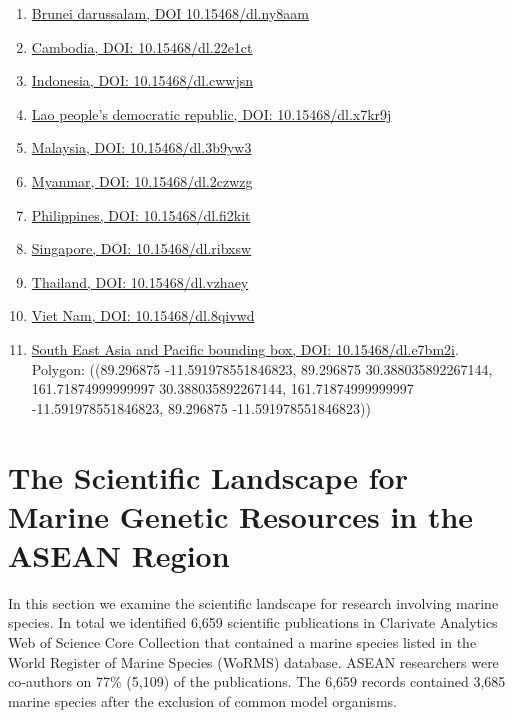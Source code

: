 \documentclass[]{book}
\providecommand{\tightlist}{%
  \setlength{\itemsep}{0pt}\setlength{\parskip}{0pt}}
\theoremstyle{definition}
\theoremstyle{definition}
\theoremstyle{definition}
\theoremstyle{remark}
\begin{document}
\begin{enumerate}
\def\labelenumi{\arabic{enumi}.}
\tightlist
\item
  \href{https://www.gbif.org/occurrence/download/0020859-180131172636756}{Brunei
  darussalam, DOI 10.15468/dl.ny8aam}
\item
  \href{https://www.gbif.org/occurrence/download/0020860-180131172636756}{Cambodia,
  DOI: 10.15468/dl.22e1ct}
\item
  \href{https://www.gbif.org/occurrence/download/0020862-180131172636756}{Indonesia,
  DOI: 10.15468/dl.cwwjsn}
\item
  \href{https://www.gbif.org/occurrence/download/0020864-180131172636756}{Lao
  people's democratic republic, DOI: 10.15468/dl.x7kr9j}
\item
  \href{https://www.gbif.org/occurrence/download/0020868-180131172636756}{Malaysia,
  DOI: 10.15468/dl.3b9yw3}
\item
  \href{https://www.gbif.org/occurrence/download/0020878-180131172636756}{Myanmar,
  DOI: 10.15468/dl.2czwzg}
\item
  \href{https://www.gbif.org/occurrence/download/0020868-180131172636756}{Philippines,
  DOI: 10.15468/dl.fi2kit}
\item
  \href{https://www.gbif.org/occurrence/download/0020880-180131172636756}{Singapore,
  DOI: 10.15468/dl.ribxsw}
\item
  \href{https://www.gbif.org/occurrence/download/0020885-180131172636756}{Thailand,
  DOI: 10.15468/dl.vzhaey}
\item
  \href{https://www.gbif.org/occurrence/download/0020888-180131172636756}{Viet
  Nam, DOI: 10.15468/dl.8qivwd}
\item
  \href{https://www.gbif.org/occurrence/download/0000637-171219132708484}{South
  East Asia and Pacific bounding box, DOI: 10.15468/dl.e7bm2i}. Polygon:
  ((89.296875 -11.591978551846823, 89.296875 30.388035892267144,
  161.71874999999997 30.388035892267144, 161.71874999999997
  -11.591978551846823, 89.296875 -11.591978551846823))
\end{enumerate}

\hypertarget{scientific}{%
\chapter{The Scientific Landscape for Marine Genetic Resources in the
ASEAN Region}\label{scientific}}

In this section we examine the scientific landscape for research
involving marine species. In total we identified 6,659 scientific
publications in Clarivate Analytics Web of Science Core Collection that
contained a marine species listed in the World Register of Marine
Species (WoRMS) database. ASEAN researchers were co-authors on 77\%
(5,109) of the publications. The 6,659 records contained 3,685 marine
species after the exclusion of common model organisms.
\end{document}
